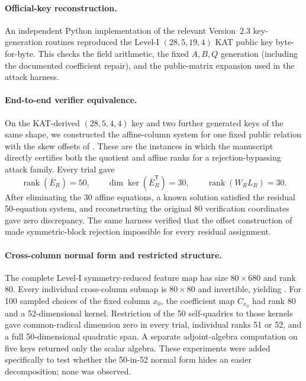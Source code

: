 \documentclass[11pt]{article}
\newcommand{\rank}{\operatorname{rank}}
\newcommand{\transpose}{\mathsf T}
\begin{document}
\paragraph{Official-key reconstruction.}
An independent Python implementation of the relevant Version~2.3 key-generation routines reproduced the Level-I $(28,5,19,4)$ KAT public key byte-for-byte.  This checks the field arithmetic, the fixed $A,B,Q$ generation (including the documented coefficient repair), and the public-matrix expansion used in the attack harness.

\paragraph{End-to-end verifier equivalence.}
On the KAT-derived $(28,5,4,4)$ key and two further generated keys of the same
shape, we constructed the affine-column system for one fixed public relation
with the skew offsets of .  These are the instances in which the
manuscript directly certifies both the quotient and affine ranks for a
rejection-bypassing attack family.  Every trial gave
\[
 \rank(\overline E_R)=50,
 \qquad \dim\ker(\overline E_R^\transpose)=30,
 \qquad \rank(W_RL_R)=30.
\]
After eliminating the 30 affine equations, a known solution satisfied the residual 50-equation system, and reconstructing the original 80 verification coordinates gave zero discrepancy.  The same harness verified that the offset construction of  made symmetric-block rejection impossible for every residual assignment.

\paragraph{Cross-column normal form and restricted structure.}
The complete Level-I symmetry-reduced feature map has size $80\times680$ and rank 80.  Every individual cross-column submap is $80\times80$ and invertible, yielding .  For 100 sampled choices of the fixed column $x_0$, the coefficient map $C_{x_0}$ had rank 80 and a 52-dimensional kernel.  Restriction of the 50 self-quadrics to those kernels gave common-radical dimension zero in every trial, individual ranks 51 or 52, and a full 50-dimensional quadratic span.  A separate adjoint-algebra computation on five keys returned only the scalar algebra.  These experiments were added specifically to test whether the 50-in-52 normal form hides an easier decomposition; none was observed.
\end{document}
